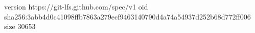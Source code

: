 version https://git-lfs.github.com/spec/v1
oid sha256:3abb4d0c41098ffb7863a279ecf9463140790d4a74a54937d252b68d772ff006
size 30653
